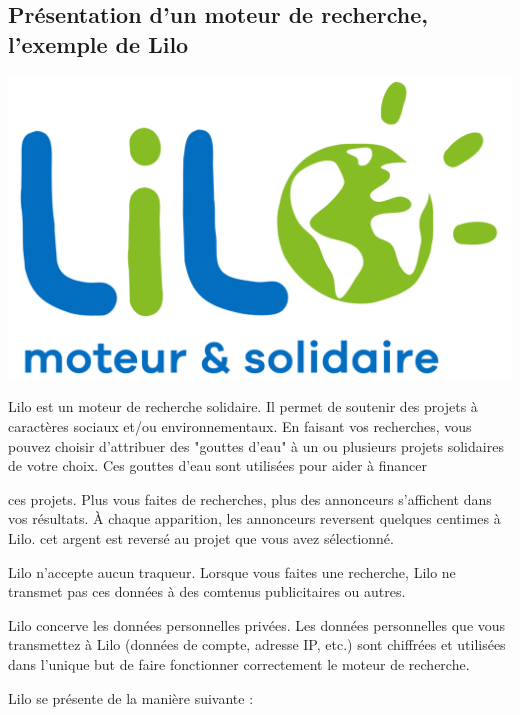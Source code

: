 \documentclass[12pt]{book}
\begin{document}
	\subsection{Présentation d'un moteur de recherche, l'exemple de Lilo}\label{sec:lilo}
		\hspace{-.8cm}
		\begin{minipage}[c]{.38\textwidth}
			\centering
			\includegraphics[width=.9\textwidth]{include/lilo_logo.png}
		\end{minipage}
		\begin{minipage}[c]{.62\textwidth}
		\hspace*{.4cm}
		Lilo est un moteur de recherche solidaire.
		Il permet de soutenir des projets à caractères sociaux et/ou environnementaux.
		En faisant vos recherches, vous pouvez choisir d'attribuer des "gouttes d'eau" à un ou plusieurs projets solidaires de votre choix.
		Ces gouttes d'eau sont utilisées pour aider à financer
		\end{minipage}
		ces projets.
		Plus vous faites de recherches, plus des annonceurs s'affichent dans vos résultats.
		À chaque apparition, les annonceurs reversent quelques centimes à Lilo.
		cet argent est reversé au projet que vous avez sélectionné.\par
		Lilo n'accepte aucun traqueur.
		Lorsque vous faites une recherche, Lilo ne transmet pas ces données à des comtenus publicitaires ou autres.\par
		Lilo concerve les données personnelles privées.
		Les données personnelles que vous transmettez à Lilo (données de compte, adresse IP, etc.) sont chiffrées et utilisées dans l'unique but de faire fonctionner correctement le moteur de recherche.\par
		Lilo se présente de la manière suivante :
\end{document}

